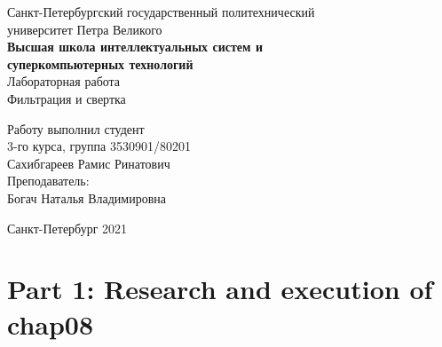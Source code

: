 \documentclass[a4paper]{article}
\begin{document}
    \begin{center}
        \begin{center}
        \hfill \break
        \normalsize{Санкт-Петербургский государственный политехнический}\\
        \normalsize{университет Петра Великого}\\
        \hfill \break
        \normalsize{\textbf{Высшая школа интеллектуальных систем и}}\\ 
        \normalsize{\textbf{суперкомпьютерных технологий}}\\ 
        \hfill \break
        \hfill \break
        \hfill \break
        \normalsize{Лабораторная работа}\\
        \hfill \break
        \hfill \break
        \normalsize{\LARGE Фильтрация и свертка}\\
        \end{center}
        \hfill \break
        \hfill \break
        \hfill \break
        \hfill \break
        \hfill \break
        \hfill \break
        \hfill \break
        \hfill \break
        \hfill \break
        \hfill \break
        \begin{flushright}
            \normalsize{Работу выполнил студент}\\
            \normalsize{3-го курса, группа 3530901/80201}\\
            \normalsize{Сахибгареев Рамис Ринатович}\\
            \hfill \break
            \normalsize{Преподаватель:}\\
            \normalsize{Богач Наталья Владимировна}\\
        \end{flushright}
        \hfill \break
        \hfill \break
        \hfill \break
        \hfill \break
        \begin{center} Санкт-Петербург 2021 \end{center}
        \thispagestyle{empty}
    \end{center}
    
    \newpage
        \tableofcontents
    
    \newpage
         \listoffigures
    
    \newpage
         \lstlistoflistings   
     
    \newpage
        \section{Part 1: Research and execution of chap08}
        
\end{document}
